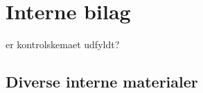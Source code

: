 
\chapter{Interne bilag}
er kontrolskemaet udfyldt?





\newpage
\section{Diverse interne materialer}

